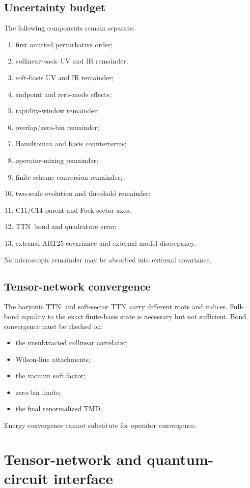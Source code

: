 \documentclass[11pt]{article}
\newcommand{\TMD}{\ensuremath{\mathrm{TMD}}}
\newcommand{\TTN}{\ensuremath{\mathrm{TTN}}}
\begin{document}
\subsection{Uncertainty budget}

The following components remain separate:
\begin{enumerate}
\item first omitted perturbative order;
\item collinear-basis UV and IR remainder;
\item soft-basis UV and IR remainder;
\item endpoint and zero-mode effects;
\item rapidity-window remainder;
\item overlap/zero-bin remainder;
\item Hamiltonian and basis counterterms;
\item operator-mixing remainder;
\item finite scheme-conversion remainder;
\item two-scale evolution and threshold remainder;
\item C11/C14 parent and Fock-sector axes;
\item \TTN\ bond and quadrature error;
\item external ART25 covariance and external-model discrepancy.
\end{enumerate}
No microscopic remainder may be absorbed into external covariance.

\subsection{Tensor-network convergence}

The baryonic \TTN\ and soft-sector \TTN\ carry different roots and indices.  Full-bond equality to the exact finite-basis state is necessary but not sufficient.  Bond convergence must be checked on:
\begin{itemize}
\item the unsubtracted collinear correlator;
\item Wilson-line attachments;
\item the vacuum soft factor;
\item zero-bin limits;
\item the final renormalized \TMD.
\end{itemize}
Energy convergence cannot substitute for operator convergence.

\section{Tensor-network and quantum-circuit interface}
\label{sec:quantum}
\end{document}
